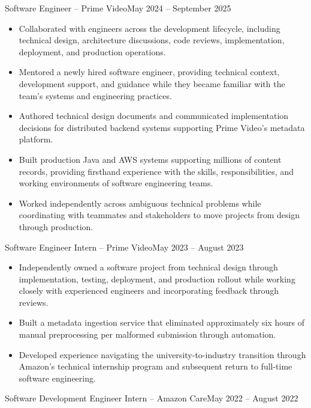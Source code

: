 \documentclass[10pt,letterpaper]{article}
\begin{document}
{Software Engineer -- Prime Video}{May 2024 -- September 2025}

\begin{itemize}
\item Collaborated with engineers across the development lifecycle, including
technical design, architecture discussions, code reviews, implementation,
deployment, and production operations.
\item Mentored a newly hired software engineer, providing technical context,
development support, and guidance while they became familiar with the team's
systems and engineering practices.
\item Authored technical design documents and communicated implementation
decisions for distributed backend systems supporting Prime Video's metadata
platform.
\item Built production Java and AWS systems supporting millions of content
records, providing firsthand experience with the skills, responsibilities,
and working environments of software engineering teams.
\item Worked independently across ambiguous technical problems while
coordinating with teammates and stakeholders to move projects from design
through production.
\end{itemize}

\vspace{2pt}

{Software Engineer Intern -- Prime Video}{May 2023 -- August 2023}

\begin{itemize}
\item Independently owned a software project from technical design through
implementation, testing, deployment, and production rollout while working
closely with experienced engineers and incorporating feedback through reviews.
\item Built a metadata ingestion service that eliminated approximately six
hours of manual preprocessing per malformed submission through automation.
\item Developed experience navigating the university-to-industry transition
through Amazon's technical internship program and subsequent return to
full-time software engineering.
\end{itemize}

\vspace{2pt}

{Software Development Engineer Intern -- Amazon Care}{May 2022 -- August 2022}
\end{document}

